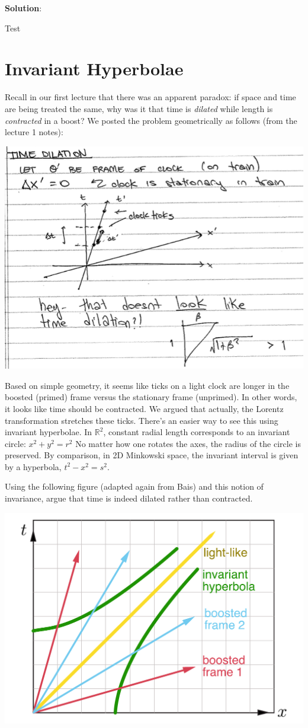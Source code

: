 \documentclass[12pt]{article}
\newenvironment{solution}%
	{\color{blue!60!black}
	\textsf{\textbf{Solution}}:
	}%
	{\ignorespacesafterend}
\numberwithin{equation}{section}    %
\begin{document}
\begin{solution}
	Test
\end{solution}


\section{Invariant Hyperbolae}

Recall in our first lecture that there was an apparent paradox: if space and time are being treated the same, why was it that time is \emph{dilated} while length is \emph{contracted} in a boost? We posted the problem geometrically as follows (from the lecture 1 notes):
\begin{center}
	\includegraphics[width=.5\textwidth]{FromLec1.png}
\end{center}
Based on simple geometry, it seems like ticks on a light clock are longer in the boosted (primed) frame versus the stationary frame (unprimed). In other words, it looks like time should be contracted. We argued that actually, the Lorentz transformation stretches these ticks. There's an easier way to see this using invariant hyperbolae.
%
In $\mathbb R^2$, constant radial length corresponds to an invariant circle: $x^2 + y^2 = r^2$ No matter how one rotates the axes, the radius of the circle is preserved. By comparison, in 2D Minkowski space, the invariant interval is given by a hyperbola, $t^2 - x^2 = s^2$. 

Using the following figure (adapted again from Bais) and this notion of invariance, argue that time is indeed dilated rather than contracted.
\begin{center}
	\includegraphics[width=.55\textwidth]{FromBais2}
\end{center}
\end{document}
